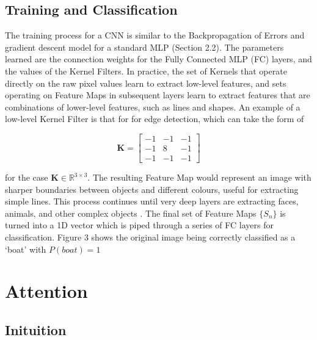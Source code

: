 \documentclass[11pt]{article}
\begin{document}
\subsection{Training and Classification}
The training process for a CNN is similar to the Backpropagation of Errors and gradient descent model for a standard MLP (Section 2.2). The parameters learned are the connection weights for the Fully Connected MLP (FC) layers, and the values of the Kernel Filters. In practice, the set of Kernels that operate directly on the raw pixel values learn to extract low-level features, and sets operating on Feature Maps in subsequent layers learn to extract features that are combinations of lower-level features, such as lines and shapes. An example of a low-level Kernel Filter is that for for edge detection, which can take the form of

\begin{equation}
\bm{K} = \left[ \begin{matrix} -1 & -1 & -1 \\ -1 & 8 & -1 \\ -1 & -1 & -1 \end{matrix} \right]
\end{equation}

for the case $\bm{K} \in \mathbb{R}^{3\times 3}$. The resulting Feature Map would represent an image with sharper boundaries between objects and different colours, useful for extracting simple lines. This process continues until very deep layers are extracting faces, animals, and other complex objects \cite{chen2}\cite{layers2}. The final set of Feature Maps $\{S_n\}$ is turned into a 1D vector which is piped through a series of FC layers for classification. Figure 3 shows the original image being correctly classified as a `boat' with $P(boat) = 1$

\section{Attention}

\subsection{Inituition}
\end{document}

